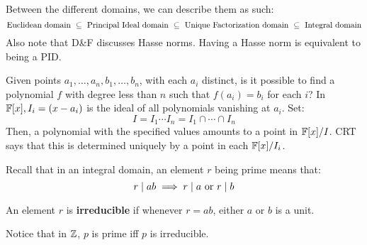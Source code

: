 Between the different domains, we can describe them as such:
\begin{equation*}
    \textrm{Euclidean domain } \subseteq
    \textrm{ Principal Ideal domain } \subseteq
    \textrm{ Unique Factorization domain } \subseteq
    \textrm{ Integral domain}
\end{equation*}
Also note that D\&F discusses Hasse norms. Having a Hasse norm is equivalent to being a PID.

\begin{xmp}[source=Primary Source Material,title=Lagrange Interpolation]
    Given points $ a_{1}, \dots, a_{n}, b_{1}, \dots, b_{n} $, with each $ a_{i} $ distinct,
    is it possible to find a polynomial $ f $ with degree less than $ n $ such that
    $ f(a_{i}) = b_{i} $ for each $ i $? \vsp
    In $ \mathbb{F}[x], I_{i} = (x - a_{i}) $ is the ideal of all polynomials vanishing at $ a_{i} $.
    Set:
    \begin{equation*}
        I = I_{1}\cdots I_{n} = I_{1} \cap \cdots \cap I_{n}
    \end{equation*}
    Then, a polynomial with the specified values amounts to a point in $ \mathbb{F}[x]/I $.
    CRT says that this is determined uniquely by a point in each $ \mathbb{F}[x]/I_{i} $.
\end{xmp}


Recall that in an integral domain, an element $ r $ being prime means that:
\begin{equation*}
    r \mid ab \implies r \mid a \textrm{ or } r \mid b
\end{equation*}

\begin{defn}
    An element $ r $ is \textbf{irreducible} if whenever $ r=ab $, either $ a $ or $ b $ is
    a unit.
\end{defn}
Notice that in $ \mathbb{Z} $, $ p $ is prime iff $ p $ is irreducible.

